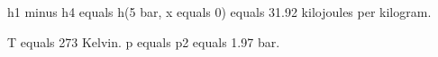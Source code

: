 h1 minus h4 equals h(5 bar, x equals 0) equals 31.92 kilojoules per kilogram.  

T equals 273 Kelvin.  
p equals p2 equals 1.97 bar.